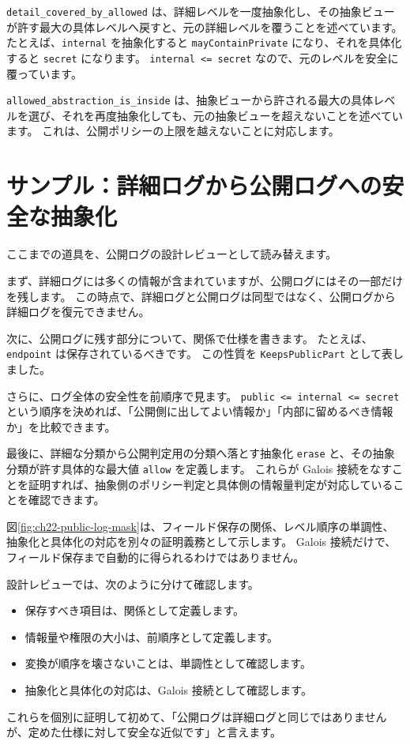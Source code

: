 \texttt{detail\_covered\_by\_allowed} は、詳細レベルを一度抽象化し、その抽象ビューが許す最大の具体レベルへ戻すと、元の詳細レベルを覆うことを述べています。
たとえば、\texttt{internal} を抽象化すると \texttt{mayContainPrivate} になり、それを具体化すると \texttt{secret} になります。
\texttt{internal <= secret} なので、元のレベルを安全に覆っています。

\texttt{allowed\_abstraction\_is\_inside} は、抽象ビューから許される最大の具体レベルを選び、それを再度抽象化しても、元の抽象ビューを超えないことを述べています。
これは、公開ポリシーの上限を越えないことに対応します。

\section{サンプル：詳細ログから公開ログへの安全な抽象化}

ここまでの道具を、公開ログの設計レビューとして読み替えます。

まず、詳細ログには多くの情報が含まれていますが、公開ログにはその一部だけを残します。
この時点で、詳細ログと公開ログは同型ではなく、公開ログから詳細ログを復元できません。

次に、公開ログに残す部分について、関係で仕様を書きます。
たとえば、\texttt{endpoint} は保存されているべきです。
この性質を \texttt{KeepsPublicPart} として表しました。

さらに、ログ全体の安全性を前順序で見ます。
\texttt{public <= internal <= secret} という順序を決めれば、「公開側に出してよい情報か」「内部に留めるべき情報か」を比較できます。

最後に、詳細な分類から公開判定用の分類へ落とす抽象化 \texttt{erase} と、その抽象分類が許す具体的な最大値 \texttt{allow} を定義します。
これらが Galois 接続をなすことを証明すれば、抽象側のポリシー判定と具体側の情報量判定が対応していることを確認できます。

図\ref{fig:ch22-public-log-mask}は、フィールド保存の関係、レベル順序の単調性、抽象化と具体化の対応を別々の証明義務として示します。
Galois 接続だけで、フィールド保存まで自動的に得られるわけではありません。


設計レビューでは、次のように分けて確認します。
\begin{itemize}
\item 保存すべき項目は、関係として定義します。
\item 情報量や権限の大小は、前順序として定義します。
\item 変換が順序を壊さないことは、単調性として確認します。
\item 抽象化と具体化の対応は、Galois 接続として確認します。
\end{itemize}
これらを個別に証明して初めて、「公開ログは詳細ログと同じではありませんが、定めた仕様に対して安全な近似です」と言えます。

